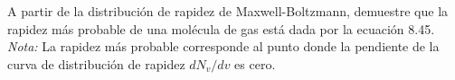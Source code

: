 \item A partir de la distribución de rapidez de Maxwell-Boltzmann, demuestre que la rapidez más probable de una molécula de gas está dada por la ecuación 8.45. \textit{Nota:} La rapidez más probable corresponde al punto donde la pendiente de la curva de distribución de rapidez $dN_v/dv$ es cero.
